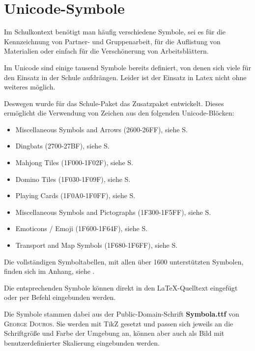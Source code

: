 \documentclass[a4paper,add-index]{cnltx-doc}
\begin{document}
\section{Unicode-Symbole}
\label{paket:utfsym}

Im Schulkontext benötigt man häufig verschiedene Symbole, sei es
für die Kennzeichnung von Partner- und Gruppenarbeit, für die
Auflistung von Materialien oder einfach für die Verschönerung
von Arbeitsblättern.

Im Unicode sind einige tausend Symbole bereits definiert, von
denen sich viele für den Einsatz in der Schule aufdrängen.
Leider ist der Einsatz in Latex nicht ohne weiteres möglich.

Deswegen wurde für das Schule-Paket das Zusatzpaket 
entwickelt. Dieses ermöglicht die Verwendung von Zeichen aus
den folgenden Unicode-Blöcken:

\begin{itemize}
	\item Miscellaneous Symbols and Arrows (2600-26FF),
		siehe S.~\pageref{utab:02600-026FF}
	\item Dingbats (2700-27BF),
		siehe S.~\pageref{utab:02700-027BF}
	\item Mahjong Tiles (1F000-1F02F),
		siehe S.~\pageref{utab:1F000-1F02F}
	\item Domino Tiles (1F030-1F09F),
		siehe S.~\pageref{utab:1F030-1F09F}
	\item Playing Cards (1F0A0-1F0FF),
		siehe S.~\pageref{utab:1F0A0-1F0FF}
	\item Miscellaneous Symbols and Pictographs (1F300-1F5FF),
		siehe S.~\pageref{utab:1F300-1F5FF}
	\item Emoticons / Emoji (1F600-1F64F),
		siehe S.~\pageref{utab:1F600-1F64F}
	\item Transport and Map Symbols (1F680-1F6FF),
		siehe S.~\pageref{utab:1F680-1F6FF}
\end{itemize}

Die vollständigen Symboltabellen, mit
allen über 1600 unterstützten Symbolen, finden sich im Anhang, siehe
.

Die entsprechenden Symbole können direkt in den LaTeX-Quelltext
eingefügt oder per Befehl eingebunden werden.

Die Symbole stammen dabei aus der Public-Domain-Schrift
\textbf{Symbola.ttf} von \textsc{George Douros}. Sie werden mit
TikZ gesetzt und passen sich jeweils an die Schriftgröße und
Farbe der Umgebung an, können aber auch als Bild mit
benutzerdefinierter Skalierung eingebunden werden.
\end{document}
